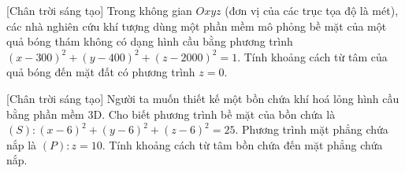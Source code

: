 \begin{bt}%
[Chân trời sáng tạo]%
	Trong không gian $Oxyz$ (đơn vị của các trục tọa độ là mét), các nhà nghiên cứu khí tượng dùng một phần mềm mô phỏng bề mặt của một quả bóng thám không có dạng hình cầu bằng phương trình $(x-300)^2+(y-400)^2+(z-2000)^2=1$. Tính khoảng cách từ tâm của quả bóng đến mặt đất có phương trình $z=0$.
\end{bt}

\begin{bt}%
[Chân trời sáng tạo]%
	Người ta muốn thiết kế một bồn chứa khí hoá lỏng hình cầu bằng phần mềm 3D. Cho biết phương trình bề mặt của bồn chứa là $(S)\colon (x-6)^2+(y-6)^2+(z-6)^2=25$. Phương trình mặt phẳng chứa nắp là $(P)\colon z=10$. Tính khoảng cách từ tâm bồn chứa đến mặt phẳng chứa nắp.
\end{bt}

